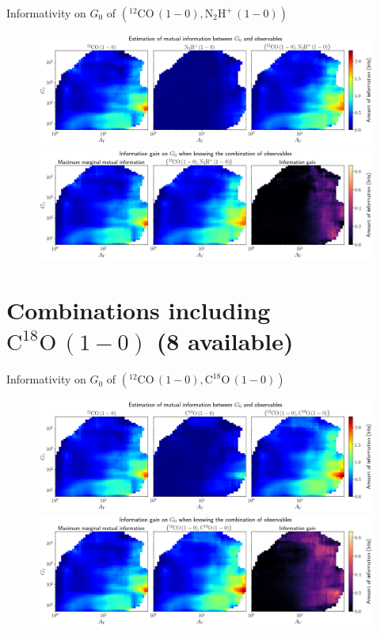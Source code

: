 \documentclass{beamer}
\begin{document}
\begin{frame}{Informativity on $G_0$ of $\left(\mathrm{^{12}CO\,(1-0)},\mathrm{N_2H^+\,(1-0)}\right)$}
    \begin{figure}
        \centering
        \includegraphics[width=0.95\linewidth]{../mi/g0__12co10_n2hp10_mi.png}
        \vfill
        \includegraphics[width=0.95\linewidth]{../mi/g0__12co10_n2hp10_mi_gain.png}
    \end{figure}
\end{frame}

\section{Combinations including $\mathrm{C^{18}O\,(1-0)}$ (8 available)}

\begin{frame}{Informativity on $G_0$ of $\left(\mathrm{^{12}CO\,(1-0)},\mathrm{C^{18}O\,(1-0)}\right)$}
    \begin{figure}
        \centering
        \includegraphics[width=0.95\linewidth]{../mi/g0__12co10_c18o10_mi.png}
        \vfill
        \includegraphics[width=0.95\linewidth]{../mi/g0__12co10_c18o10_mi_gain.png}
    \end{figure}
\end{frame}
\end{document}
